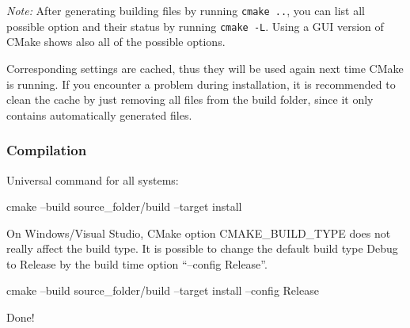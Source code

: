 \textit{Note:} After generating building files by running \texttt{cmake ..}, you can list all possible option and their status by running \texttt{cmake -L}. 
Using a GUI version of CMake shows also all of the possible options.   

Corresponding settings are cached, thus they will be used again next time CMake is running.
If you encounter a problem during installation, it is recommended to clean the cache by just removing all files from the build folder, since it only contains automatically generated files. 


\subsubsection{Compilation}
Universal command for all systems:
\begin{listing}[mybash]
cmake --build {source_folder}/build --target install
\end{listing}

On Windows/Visual Studio, CMake option CMAKE\_BUILD\_TYPE does not really affect the build type. It is possible to change the default build type Debug to Release by the build time option ``--config Release''.
\begin{listing}[mybash]
cmake --build {source_folder}/build --target install --config Release
\end{listing}

Done!
